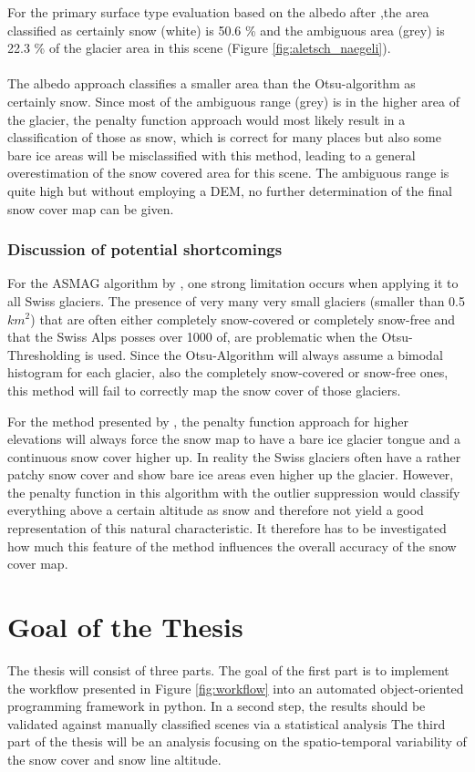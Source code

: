\documentclass[12pt]{article}
\begin{document}
For the primary surface type evaluation based on the albedo after \cite{Naegeli2018},the area classified as certainly snow (white) is 50.6 \% and the ambiguous area (grey) is 22.3 \%  of the glacier area in this scene (Figure \ref{fig:aletsch_naegeli}).\\
\\
The albedo approach classifies a smaller area than the Otsu-algorithm as certainly snow. Since most of the ambiguous range (grey) is in the higher area of the glacier, the penalty function approach would most likely result in a classification of those as snow, which is correct for many places but also some bare ice areas will be misclassified with this method, leading to a general overestimation of the snow covered area for this scene. The ambiguous range is quite high but without employing a DEM, no further determination of the final snow cover map can be given.

\subsubsection{Discussion of potential shortcomings}
For the ASMAG algorithm by \cite{Rastner2017}, one strong limitation occurs when applying it to all Swiss glaciers. The presence of very many very small glaciers (smaller than 0.5 $km^2$) that are often either completely snow-covered or completely snow-free and that the Swiss Alps posses over 1000 of, are problematic when the Otsu-Thresholding is used. Since the Otsu-Algorithm will always assume a bimodal histogram for each glacier, also the completely snow-covered or snow-free ones, this method will fail to correctly map the snow cover of those glaciers. 

For the method presented by \cite{Naegeli2018}, the penalty function approach for higher elevations will always force the snow map to have a bare ice glacier tongue and a continuous snow cover higher up. In reality the Swiss glaciers often have a rather patchy snow cover and show bare ice areas even higher up the glacier. However, the penalty function in this algorithm with the outlier suppression would classify everything above a certain altitude as snow and therefore not yield a good representation of this natural characteristic. It therefore has to be investigated how much this feature of the method influences the overall accuracy of the snow cover map.

\newpage
\section{Goal of the Thesis}
The thesis will consist of three parts. The goal of the first part is to implement the workflow presented in Figure \ref{fig:workflow} into an automated object-oriented programming framework in python. In a second step, the results should be validated against manually classified scenes via a statistical analysis
The third part of the thesis will be an analysis focusing on the spatio-temporal variability of the snow cover and snow line altitude. \\
\end{document}

